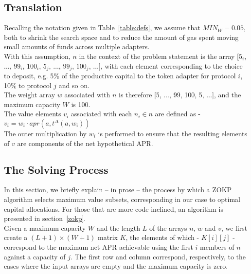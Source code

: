 \documentclass{article}
\begin{document}
\subsection{Translation}

\noindent
Recalling the notation given in Table~\ref{table:defs}, we assume that $MIN_W = 0.05$, both to shrink the search space and to reduce the amount of gas spent moving small amounts of funds across multiple adapters.\\

\noindent
With this assumption, $n$ in the context of the problem statement is the array [$5_i$, $\dots$, $99_i$, $100_i$, $5_j$, $\dots$, $99_j$, $100_j$, $\dots$], with each element corresponding to the choice to deposit, e.g. 5\% of the productive capital to the token adapter for protocol $i$, 10\% to protocol $j$ and so on.\\

\noindent
The weight array $w$ associated with $n$ is therefore [5, $\dots$, 99, 100, 5, $\dots$], and the maximum capacity $W$ is 100.\\

\noindent
The value elements $v_i$ associated with each $n_i \in n$ are defined as - \\

$v_i = w_i \cdot apr(a, t^{\Delta}(a, w_i))$\\

\noindent
The outer multiplication by $w_i$ is performed to ensure that the resulting elements of $v$ are components of the net hypothetical APR.

\subsection{The Solving Process}

In this section, we briefly explain -- in prose -- the process by which a ZOKP algorithm selects maximum value subsets, corresponding in our case to optimal capital allocations. For those that are more code inclined, an algorithm is presented in section~\ref{zokp}.\\

\noindent
Given a maximum capacity $W$ and the length $L$ of the arrays $n$, $w$ and $v$, we first create a $(L+1) \times (W+1)$ matrix $K$, the elements of which - $K[i][j]$ - correspond to the maximum net APR achievable using the first $i$ members of $n$ against a capacity of $j$. The first row and column correspond, respectively, to the cases where the input arrays are empty and the maximum capacity is zero.\\
\end{document}
